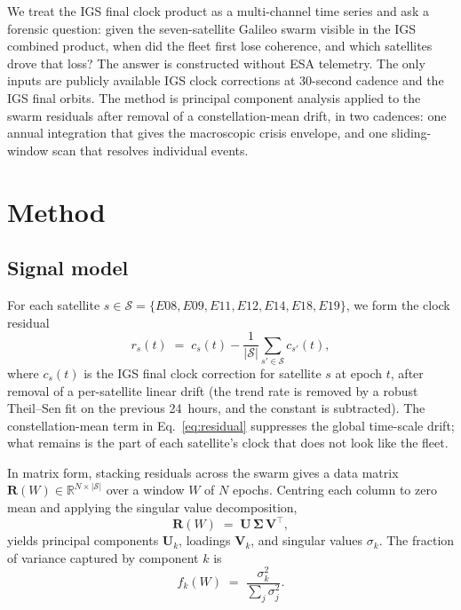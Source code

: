 \documentclass[11pt,a4paper]{article}
\begin{document}
We treat the IGS final clock product as a multi-channel time series and ask a forensic question: given the seven-satellite Galileo swarm visible in the IGS combined product, when did the fleet first lose coherence, and which satellites drove that loss? The answer is constructed without ESA telemetry. The only inputs are publicly available IGS clock corrections at 30-second cadence and the IGS final orbits. The method is principal component analysis applied to the swarm residuals after removal of a constellation-mean drift, in two cadences: one annual integration that gives the macroscopic crisis envelope, and one sliding-window scan that resolves individual events.

\section{Method}

\subsection{Signal model}

For each satellite $s \in \mathcal{S} = \{E08, E09, E11, E12, E14, E18, E19\}$, we form the clock residual
\begin{equation}
    r_s(t) \;=\; c_s(t) - \frac{1}{|\mathcal{S}|} \sum_{s' \in \mathcal{S}} c_{s'}(t),
    \label{eq:residual}
\end{equation}
where $c_s(t)$ is the IGS final clock correction for satellite $s$ at epoch $t$, after removal of a per-satellite linear drift (the trend rate is removed by a robust Theil--Sen fit on the previous 24~hours, and the constant is subtracted). The constellation-mean term in Eq.~\eqref{eq:residual} suppresses the global time-scale drift; what remains is the part of each satellite's clock that does not look like the fleet.

In matrix form, stacking residuals across the swarm gives a data matrix $\mathbf{R}(W) \in \mathbb{R}^{N \times |\mathcal{S}|}$ over a window $W$ of $N$ epochs. Centring each column to zero mean and applying the singular value decomposition,
\begin{equation}
    \mathbf{R}(W) \;=\; \mathbf{U}\,\boldsymbol{\Sigma}\,\mathbf{V}^\top,
\end{equation}
yields principal components $\mathbf{U}_k$, loadings $\mathbf{V}_k$, and singular values $\sigma_k$. The fraction of variance captured by component $k$ is
\begin{equation}
    f_k(W) \;=\; \frac{\sigma_k^2}{\sum_j \sigma_j^2}.
\end{equation}
\end{document}
